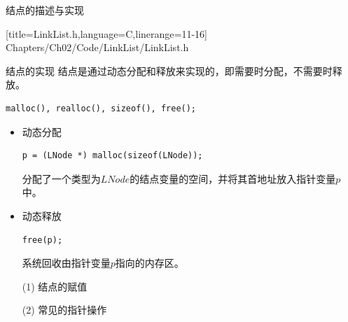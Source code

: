 \begin{frame}

\end{frame}
%
%
\begin{frame}[fragile]
\textcolor{acolor5}{结点的描述与实现}

[title=LinkList.h,language=C,linerange={11-16}]
{Chapters/Ch02/Code/LinkList/LinkList.h}
\end{frame}
%
\begin{frame}[fragile]\ft{\subsecname}
\textcolor{acolor5}{结点的实现}
结点是通过动态分配和释放来实现的，即需要时分配，不需要时释放。
\begin{lstlisting}[frame=no]
malloc(), realloc(), sizeof(), free();
\end{lstlisting}
\pause 
\begin{itemize}
\item 动态分配
\begin{lstlisting}[frame=no]
p = (LNode *) malloc(sizeof(LNode));
\end{lstlisting}
分配了一个类型为$LNode$的结点变量的空间，并将其首地址放入指针变量$p$中。\\[0.1in]
\item \pause 动态释放
\begin{lstlisting}[frame=no]
free(p);
\end{lstlisting}
系统回收由指针变量$p$指向的内存区。
\end{itemize}
\end{frame}
%
\begin{frame}[fragile]
\begin{itemize}
\item[(1)] 结点的赋值


\end{itemize}

\end{frame}
%
%
\begin{frame}[fragile]
\begin{itemize}
\item[(2)] 常见的指针操作

\end{itemize}
\end{frame}
%
%
\begin{frame}[fragile] 

\end{frame}

\begin{frame}[fragile]

\end{frame}

